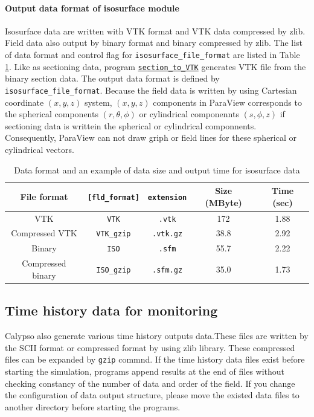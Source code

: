\paragraph{Output data format of isosurface module}
\label{sec:PSF_data}
Isosurface data are written with VTK format and VTK data compressed by zlib. Field data also output by binary format and binary compressed by zlib. The list of data format and control flag for \verb|isosurface_file_format| are listed in Table \ref{table:ISO_data}. Like as sectioning data, program \hyperref[section:section_to_VTK]{\tt section\_to\_VTK} generates VTK file from the binary section data. The output data format is defined by \verb|isosurface_file_format|. Because the field data is written by using Cartesian coordinate $(x,y,z)$ system, $(x,y,z)$ components in ParaView corresponds to the spherical components $(r, \theta, \phi)$ or cylindrical componennts $(s,\phi, z)$ if sectioning data is writtein the spherical or cylindrical componnents. Consequently, ParaView can not draw griph or field lines for these spherical or cylindrical vectors.
%
\begin{table}[htp]
\caption{Data format and an example of data size and output time for isosurface data}
\label{table:ISO_data}
\begin{center} 
\begin{tabular}{|c|c|c|c|c|}
\hline
File format & \verb|[fld_format]| & \verb|extension| &  Size  (MByte) & Time (sec)   \\ \hline \hline
VTK &\verb|VTK| &  \verb|.vtk| & 172 & 1.88 \\ \hline
Compressed VTK &\verb|VTK_gzip| &  \verb|.vtk.gz| & 38.8 & 2.92  \\ \hline
Binary &\verb|ISO| &  \verb|.sfm| & 55.7 & 2.22 \\ \hline
Compressed binary & \verb|ISO_gzip| & \verb|.sfm.gz| & 35.0 &  1.73  \\ \hline
\end{tabular}
\end{center} 
\end{table} 
%

\subsection{Time history data for monitoring}
Calypso also generate various time history outputs data.These files are written by the SCII format or compressed format by using zlib library. These compressed files can be expanded by {\tt gzip} commnd. 
If the time history data files exist before starting the simulation, programs append results at the end of files without checking constancy of the number of data and order of the field. If you change the configuration of data output structure, please move the existed data files to another directory before starting the programs.

